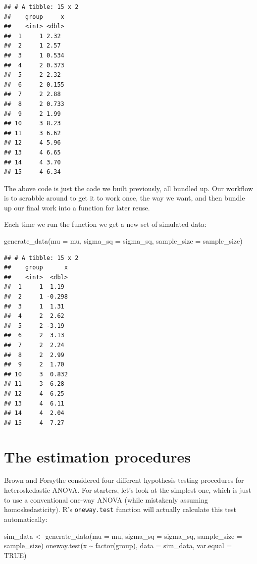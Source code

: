 \documentclass[
]{book}
\newenvironment{Shaded}{\begin{snugshade}}{\end{snugshade}}
\newcommand{\AttributeTok}[1]{\textcolor[rgb]{0.77,0.63,0.00}{#1}}
\newcommand{\ConstantTok}[1]{\textcolor[rgb]{0.00,0.00,0.00}{#1}}
\newcommand{\FunctionTok}[1]{\textcolor[rgb]{0.00,0.00,0.00}{#1}}
\newcommand{\NormalTok}[1]{#1}
\newcommand{\OtherTok}[1]{\textcolor[rgb]{0.56,0.35,0.01}{#1}}
\newcommand{\SpecialCharTok}[1]{\textcolor[rgb]{0.00,0.00,0.00}{#1}}
\begin{document}
\begin{verbatim}
## # A tibble: 15 x 2
##    group     x
##    <int> <dbl>
##  1     1 2.32 
##  2     1 2.57 
##  3     1 0.534
##  4     2 0.373
##  5     2 2.32 
##  6     2 0.155
##  7     2 2.88 
##  8     2 0.733
##  9     2 1.99 
## 10     3 8.23 
## 11     3 6.62 
## 12     4 5.96 
## 13     4 6.65 
## 14     4 3.70 
## 15     4 6.34
\end{verbatim}

The above code is just the code we built previously, all bundled up.
Our workflow is to scrabble around to get it to work once, the way we want, and then bundle up our final work into a function for later reuse.

Each time we run the function we get a new set of simulated data:

\begin{Shaded}
\begin{Highlighting}[]
\FunctionTok{generate\_data}\NormalTok{(}\AttributeTok{mu =}\NormalTok{ mu, }\AttributeTok{sigma\_sq =}\NormalTok{ sigma\_sq, }\AttributeTok{sample\_size =}\NormalTok{ sample\_size)}
\end{Highlighting}
\end{Shaded}

\begin{verbatim}
## # A tibble: 15 x 2
##    group      x
##    <int>  <dbl>
##  1     1  1.19 
##  2     1 -0.298
##  3     1  1.31 
##  4     2  2.62 
##  5     2 -3.19 
##  6     2  3.13 
##  7     2  2.24 
##  8     2  2.99 
##  9     2  1.70 
## 10     3  0.832
## 11     3  6.28 
## 12     4  6.25 
## 13     4  6.11 
## 14     4  2.04 
## 15     4  7.27
\end{verbatim}

\hypertarget{the-estimation-procedures}{%
\section{The estimation procedures}\label{the-estimation-procedures}}

Brown and Forsythe considered four different hypothesis testing procedures for heteroskedastic ANOVA. For starters, let's look at the simplest one, which is just to use a conventional one-way ANOVA (while mistakenly assuming homoskedasticity). R's \texttt{oneway.test} function will actually calculate this test automatically:

\begin{Shaded}
\begin{Highlighting}[]
\NormalTok{sim\_data }\OtherTok{\textless{}{-}} \FunctionTok{generate\_data}\NormalTok{(}\AttributeTok{mu =}\NormalTok{ mu, }\AttributeTok{sigma\_sq =}\NormalTok{ sigma\_sq,}
                          \AttributeTok{sample\_size =}\NormalTok{ sample\_size)}
\FunctionTok{oneway.test}\NormalTok{(x }\SpecialCharTok{\textasciitilde{}} \FunctionTok{factor}\NormalTok{(group), }\AttributeTok{data =}\NormalTok{ sim\_data, }\AttributeTok{var.equal =} \ConstantTok{TRUE}\NormalTok{)}
\end{Highlighting}
\end{Shaded}
\end{document}

